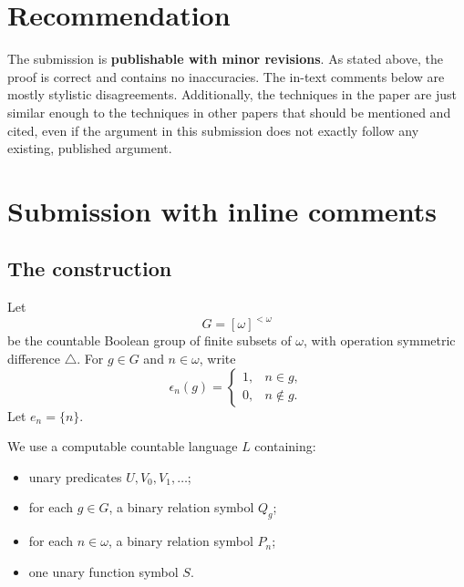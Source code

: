 \documentclass[12pt]{article}
\begin{document}
\section{Recommendation}

The submission is \textbf{publishable with minor revisions}. As stated above, the proof is correct and contains no inaccuracies. The in-text comments below are mostly stylistic disagreements. Additionally, the techniques in the paper are just similar enough to the techniques in other papers that should be mentioned and cited, even if the argument in this submission does not exactly follow any existing, published argument.

  \section{Submission with inline comments}


\date{}



\begin{abstract}
We answer the question affirmatively.  We build a computable countable
structure $\mathcal A$ such that every automorphism of every copy of
$\mathcal A$ is computable from that copy, but for every finite tuple of
parameters $\bar a$ there is an automorphism $\pi$ whose graph is not
$\Sigma^{\mathrm{in}}_1$-definable over $\bar a\cup\pi(\bar a)$.
\end{abstract}

\subsection*{The construction}

Let
\[
G=[\omega]^{<\omega}
\]
be the countable Boolean group of finite subsets of $\omega$, with operation
symmetric difference $\triangle$.  For $g\in G$ and $n\in\omega$, write
\[
\epsilon_n(g)=
\begin{cases}
1,& n\in g,\\
0,& n\notin g.
\end{cases}
\]
Let $e_n=\{n\}$.

We use a computable countable language $L$ containing:
\begin{itemize}
\item unary predicates $U,V_0,V_1,\dots$;
\item for each $g\in G$, a binary relation symbol $Q_g$;
\item for each $n\in\omega$, a binary relation symbol $P_n$;
\item one unary function symbol $S$.
\end{itemize}
\end{document}
